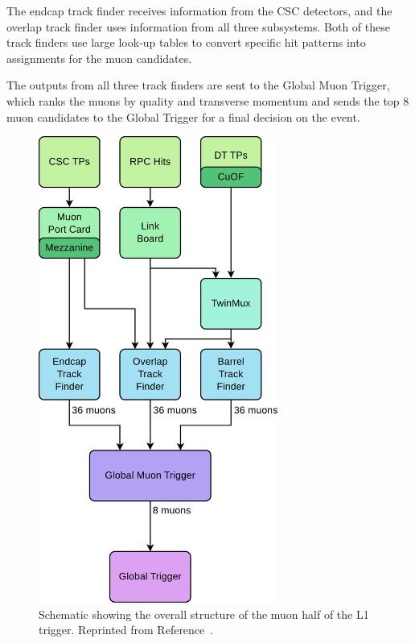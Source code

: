 The endcap track finder receives information from the CSC detectors, and the overlap track finder uses information from all three subsystems. Both of these track finders use large look-up tables to convert specific hit patterns into \pT assignments for the muon candidates.

The outputs from all three track finders are sent to the Global Muon Trigger, which ranks the muons by quality and transverse momentum and sends the top 8 muon candidates to the Global Trigger for a final decision on the event.

\begin{figure}[h]
\begin{center}
\includegraphics[width=0.7\textwidth]{Figures/Trigger/muonL1T.pdf}
\end{center}
\caption{Schematic showing the overall structure of the muon half of the L1 trigger. Reprinted from Reference~\cite{L1twiki}.}
\label{fig:muonL1T}
\end{figure}

